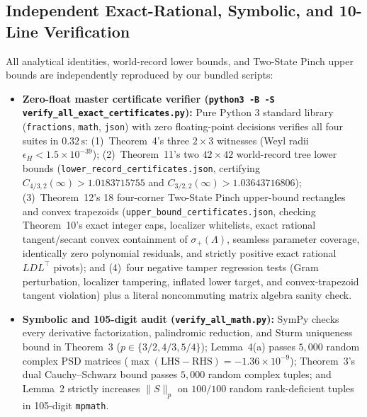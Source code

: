 \documentclass[10pt,letterpaper]{article}
\begin{document}
\subsection{Independent Exact-Rational, Symbolic, and 10-Line Verification}

All analytical identities, world-record lower bounds, and Two-State Pinch upper bounds are independently reproduced by our bundled scripts:
\begin{itemize}[leftmargin=1.5em,itemsep=2pt]
  \item \textbf{Zero-float master certificate verifier (\texttt{python3 -B -S verify\_all\_exact\_certificates.py}):} Pure Python 3 standard library (\texttt{fractions}, \texttt{math}, \texttt{json}) with zero floating-point decisions verifies all four suites in $0.32\,\mathrm{s}$: (1)~Theorem~4's three $2\times 3$ witnesses (Weyl radii $\epsilon_H < 1.5\times 10^{-39}$); (2)~Theorem~11's two $42\times 42$ world-record tree lower bounds (\texttt{lower\_record\_certificates.json}, certifying $C_{4/3,2}(\infty) > 1.0183715755$ and $C_{3/2,2}(\infty) > 1.03643716806$); (3)~Theorem~12's 18 four-corner Two-State Pinch upper-bound rectangles and convex trapezoids (\texttt{upper\_bound\_certificates.json}, checking Theorem~10's exact integer caps, localizer whitelists, exact rational tangent/secant convex containment of $\sigma_+(\Lambda)$, seamless parameter coverage, identically zero polynomial residuals, and strictly positive exact rational $LDL^\top$ pivots); and (4)~four negative tamper regression tests (Gram perturbation, localizer tampering, inflated lower target, and convex-trapezoid tangent violation) plus a literal noncommuting matrix algebra sanity check.
  \item \textbf{Symbolic and 105-digit audit (\texttt{verify\_all\_math.py}):} SymPy checks every derivative factorization, palindromic reduction, and Sturm uniqueness bound in Theorem~3 ($p \in \{3/2, 4/3, 5/4\}$); Lemma~4(a) passes $5{,}000$ random complex PSD matrices ($\max(\mathrm{LHS}-\mathrm{RHS}) = -1.36\times 10^{-9}$); Theorem~3's dual Cauchy--Schwarz bound passes $5{,}000$ random complex tuples; and Lemma~2 strictly increases $\|S\|_p$ on $100/100$ random rank-deficient tuples in 105-digit \texttt{mpmath}.
\end{itemize}
\end{document}
